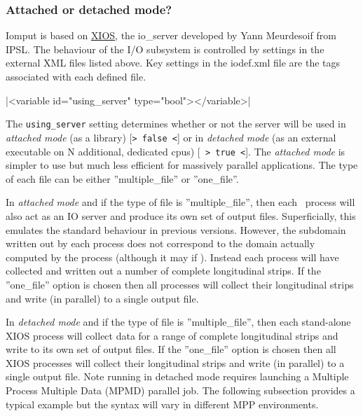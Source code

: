 \documentclass[../main/NEMO_manual]{subfiles}
\begin{document}
\subsubsection{Attached or detached mode?}

Iomput is based on \href{http://forge.ipsl.jussieu.fr/ioserver/wiki}{XIOS},
the io\_server developed by Yann Meurdesoif from IPSL.
The behaviour of the I/O subsystem is controlled by settings in the external XML files listed above.
Key settings in the iodef.xml file are the tags associated with each defined file.

\xmlline|<variable id="using_server" type="bool"></variable>|

The \texttt{using\_server} setting determines whether or not the server will be used in
\textit{attached mode}
(as a library) [\texttt{> false <}] or in \textit{detached mode}
(as an external executable on N additional, dedicated cpus) [\texttt{ > true <}].
The \textit{attached mode} is simpler to use but much less efficient for
massively parallel applications.
The type of each file can be either ''multiple\_file'' or ''one\_file''.

In \textit{attached mode} and if the type of file is ''multiple\_file'',
then each \NEMO\ process will also act as an IO server and produce its own set of output files.
Superficially, this emulates the standard behaviour in previous versions.
However, the subdomain written out by each process does not correspond to
the  domain actually computed by the process (although it may if ).
Instead each process will have collected and written out a number of complete longitudinal strips.
If the ''one\_file'' option is chosen then all processes will collect their longitudinal strips and
write (in parallel) to a single output file.

In \textit{detached mode} and if the type of file is ''multiple\_file'',
then each stand-alone XIOS process will collect data for a range of complete longitudinal strips and
write to its own set of output files.
If the ''one\_file'' option is chosen then all XIOS processes will collect their longitudinal strips and
write (in parallel) to a single output file.
Note running in detached mode requires launching a Multiple Process Multiple Data (MPMD) parallel job.
The following subsection provides a typical example but the syntax will vary in different MPP environments.
\end{document}
